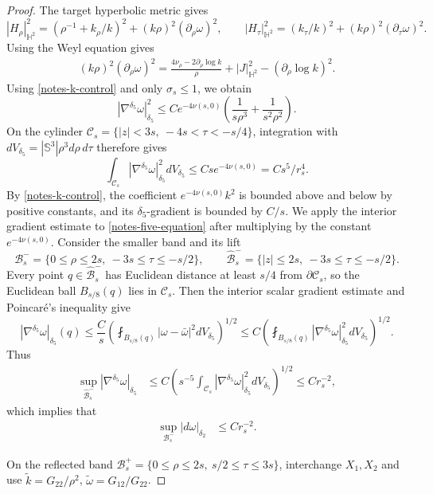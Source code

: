 \documentclass[letterpaper]{amsart}
\theoremstyle{definition}
\theoremstyle{remark}
\begin{document}
\begin{proof}
The target hyperbolic metric gives
\[
 |H_\rho|_{\mathbb H^2}^2=(\rho^{-1}+k_\rho/k)^2+(k\rho)^2(\partial_\rho\omega)^2,
 \qquad
 |H_\tau|_{\mathbb H^2}^2=(k_\tau/k)^2+(k\rho)^2(\partial_\tau\omega)^2.
\]
Using the Weyl equation gives
\begin{align*}
(k\rho)^2(\partial_\rho\omega)^2
=\frac{4\nu_\rho-2\partial_\rho\log k}{\rho}
+|J|_{\mathbb H^2}^2-(\partial_\rho\log k)^2.
\end{align*} 
Using \eqref{notes-k-control} and only
$\sigma_s\le1$, we obtain
\[
 |\nabla^{\delta_5}\omega|_{\delta_5}^2
 \le Ce^{-4\nu(s,0)}\left(\frac1{s\rho^3}+\frac1{s^2\rho^2}\right).
\]
On the cylinder $\mathcal C_s=\{|z|<3s,\ -4s<\tau<-s/4\}$, integration
with $dV_{\delta_5}=|\mathbb{S}^3|\rho^3d\rho\,d\tau$ therefore gives
\[
 \int_{\mathcal C_s}|\nabla^{\delta_5}\omega|_{\delta_5}^2dV_{\delta_5}
 \le Cs e^{-4\nu(s,0)}=Cs^5/r_s^4.
\]
By \eqref{notes-k-control}, the coefficient $e^{-4\nu(s,0)}k^2$ is bounded
above and below by positive constants, and its $\delta_5$-gradient is bounded
by $C/s$. We apply the interior gradient estimate to
\eqref{notes-five-equation} after multiplying by the constant $e^{-4\nu(s,0)}$.
Consider the smaller band and its lift
\[
 \mathcal B_s^-=\{0\le\rho\le2s,\ -3s\le\tau\le-s/2\},\qquad
 \widehat{\mathcal B}_s^-=\{|z|\le2s,\ -3s\le\tau\le-s/2\}.
\]
Every point $q\in\widehat{\mathcal B}_s^-$ has Euclidean distance at least
$s/4$ from $\partial\mathcal C_s$, so the Euclidean ball
$B_{s / 8}(q)$ lies in $\mathcal C_s$. Then the interior scalar gradient estimate and Poincar\'e's
inequality give
\[
 |\nabla^{\delta_5}\omega|_{\delta_5}(q)
 \le \frac{C}{s}
 \left(\fint_{B_{s /8}(q)}|\omega-\bar\omega|^2dV_{\delta_5}\right)^{1/2}
 \le C\left(\fint_{B_{s /8}(q)}
 |\nabla^{\delta_5}\omega|_{\delta_5}^2dV_{\delta_5}\right)^{1/2}.
\]
Thus
\begin{equation}
 \begin{aligned}
 \sup_{\widehat{\mathcal B}_s^-}|\nabla^{\delta_5}\omega|_{\delta_5}
 &\le C\left(s^{-5}\int_{\mathcal C_s}
 |\nabla^{\delta_5}\omega|_{\delta_5}^2dV_{\delta_5}\right)^{1/2}
 \le Cr_s^{-2}, 
 \end{aligned}
\end{equation}
which implies that
\begin{align}\label{notes-twist-gradient}
	\sup_{\mathcal B_s^-}|d \omega|_{\delta _2}&\le Cr_s^{-2}.
\end{align} 

On the reflected band $\mathcal B_s^+=\{0\le\rho\le2s,\ s/2\le\tau\le3s\}$,
interchange $X_1,X_2$ and use
$\widetilde k=G_{22}/\rho^2$, $\widetilde\omega=G_{12}/G_{22}$.


\end{proof}
\end{document}
